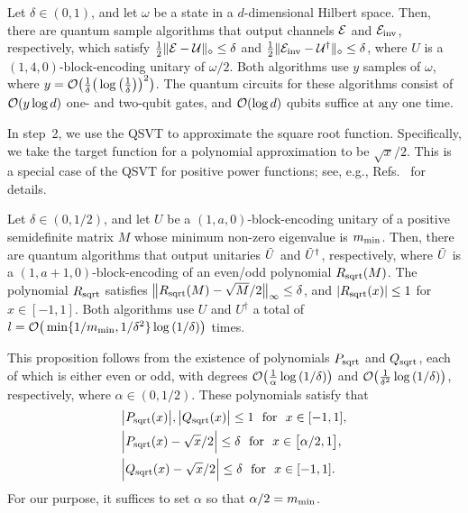 \begin{theorem}
\label{thm:BEquantum state form sample}
Let $\delta \in (0, 1)$, and let $\omega$ be a state in a $d$-dimensional Hilbert
space. 
Then, there are quantum sample algorithms that output channels ${\mathcal{E}}$ and ${\mathcal{E}}_{\rm inv}$, respectively, which satisfy $\frac{1}{2}\|{\mathcal{E}} - {\mathcal{U}}\|_\diamond \leq \delta$ and $\frac{1}{2}\|{\mathcal{E}}_{\rm inv} - {\mathcal{U}}^\dag\|_\diamond \leq \delta$, where $U$ is a $(1, 4, 0)$-block-encoding unitary of $\omega/2$.
Both algorithms use $y$ samples of $\omega$, where $y = {\mathcal{O}}\big(\frac{1}{\delta}\big(\log{\big(\frac{1}{\delta}\big)}\big)^2\big)$.
The quantum circuits for these algorithms consist of ${\mathcal{O}}(y\log{d})$ one- and two-qubit gates, and ${\mathcal{O}}(\log{d})$ qubits suffice at any one time.
\end{theorem}


In step~2, we use the QSVT to approximate the square root function. 
Specifically, we take the target function for a polynomial approximation to be $\sqrt{x}/2$. This is a special case of the QSVT for positive power functions; see, e.g., Refs.~\cite{Gilyn2019thesis, gilyen2022improvedfidelity, wang2024NewQuantEnt} for details.



\begin{proposition}
\label{prop:QSVT sqrt}
Let $\delta \in (0, 1/2)$, and let $U$ be a $(1, a, 0)$-block-encoding unitary of a positive semidefinite matrix $M$ whose minimum non-zero eigenvalue is $m_{\rm min}$. Then, there are quantum algorithms that output unitaries $\tilde{U}$ and $\tilde{U}^\dag$, respectively, where $\tilde{U}$ is a $(1, a+1, 0)$-block-encoding of an even/odd polynomial $R_{\rm sqrt}(M)$.
The polynomial $R_{\rm sqrt}$ satisfies $\big\|R_{\rm sqrt}(M) - \sqrt{M}/2\big\|_\infty \leq \delta$, and $|R_{\rm sqrt}(x)| \leq 1$ for $x \in [-1, 1]$. 
Both algorithms use $U$ and $U^\dag$ a total of $l = {\mathcal{O}}\big(\min\{1/m_{\rm min}, 1/\delta^2\}\log{(1/\delta)}\big)$ times.
\end{proposition}

This proposition follows from the existence of polynomials $P_{\rm sqrt}$ and $Q_{\rm sqrt}$, each of which is either even or odd, with degrees ${\mathcal{O}}\big(\frac{1}{\alpha}\log{(1/\delta)}\big)$ and ${\mathcal{O}}\big(\frac{1}{\delta^2}\log{(1/\delta)}\big)$, respectively, where $\alpha \in (0, 1/2)$.
These polynomials satisfy that 
\begin{align}
    &\big|P_{\rm sqrt}(x)\big|, \big|Q_{\rm sqrt}(x)\big| \leq 1 
    \ \ \textrm{for} \ \ x \in [-1, 1], \\
    &\Big|P_{\rm sqrt}(x) - \sqrt{x}/2\Big| \leq \delta
    \ \ \textrm{for} \ \ x \in \big[\alpha/2, 1\big], \\
    &\Big|Q_{\rm sqrt}(x) - \sqrt{x}/2\Big| \leq \delta
    \ \ \textrm{for} \ \ x \in [-1, 1].
\end{align}
For our purpose, it suffices to set $\alpha$ so that $\alpha/2 = m_{\rm min}$.




